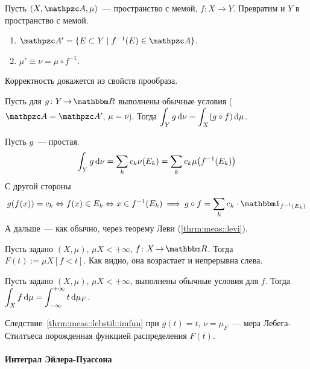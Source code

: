 \documentclass[draft, timbord]{longnotes}
\begin{document}
\begin{defn}\label{defn:meas::lebstil::imag}
  Пусть $(X,\alg,\mu)$~--- пространство с мемой, $f\colon X \to Y$. 
  Превратим и $Y$ в пространство с мемой.
  \begin{enumerate}
    \item $\alg' = \{E \subset Y \mid f^{-1} (E) \in \alg\}$.
    \item $\mu' \equiv \nu = \mu \circ f^{-1} $.
  \end{enumerate}
\end{defn}
Корректность докажется из свойств прообраза.

\begin{thrm}\label{thrm:meas::lebstil::imfun}
  Пусть для $g\colon Y \to \R$ выполнены обычные условия ($\alg = \alg'$, $\mu=\nu$).
  Тогда $\displaystyle \int_Y g \, \mathrm{d} \nu  = \int_X (g \circ f)\, \mathrm{d} \mu$.
\end{thrm}
\begin{tproof}
  Пусть $g$~--- простая. 
  \[
    \int_Y g\, \mathrm{d} \nu = \sum_k c_k \nu (E_k) = \sum_k c_k \mu \bigl(f^{-1} (E_k)\bigr)
  \]
  С другой стороны \[
    g(f(x)) = c_k \Leftrightarrow f(x) \in E_k \Leftrightarrow x \in f^{-1}(E_k) 
    \: \Longrightarrow \:
    g \circ f = \sum_k c_k \cdot \ind_{f^{-1}(E_k)}
  \]
  А дальше~--- как обычно, через теорему Леви (\ref{thrm:meas::levi}).
\end{tproof}

\begin{defn}\label{defn:meas::lebstil::distr}
  Пусть задано $(X, \mu)$, $\mu X < + \infty$, $f\colon X \to \R$. Тогда
  $F(t) := \mu X  [f <t]$. Как видно, она возрастает и непрерывна слева.
\end{defn}

\begin{thrm}\label{thrm:meas::lebstil::distint}
  Пусть задано $(X, \mu)$, $\mu X < + \infty$, выполнены обычные условия для $f$.
  Тогда $\displaystyle \int_X f \, \mathrm{d} \mu = \int_{-\infty}^{+\infty} t \, \mathrm{d} \mu_F$.
\end{thrm}
\begin{tproof}
  Следствие~\ref{thrm:meas::lebstil::imfun} при  $g(t) = t$, $\nu = \mu_F$~--- мера Лебега-Стилтъеса
  порожденная функцией распределения $F(t)$.
\end{tproof}

\paragraph{Интеграл Эйлера-Пуассона}
\label{par:meas::eulpuass}
\end{document}
